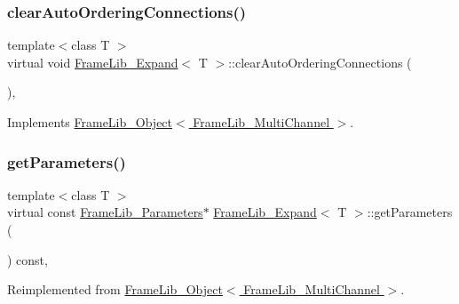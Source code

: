 \subsubsection{\texorpdfstring{clear\+Auto\+Ordering\+Connections()}{clearAutoOrderingConnections()}}
{\footnotesize\ttfamily template$<$class T $>$ \\
virtual void \hyperlink{class_frame_lib___expand}{Frame\+Lib\+\_\+\+Expand}$<$ T $>$\+::clear\+Auto\+Ordering\+Connections (\begin{DoxyParamCaption}{ }\end{DoxyParamCaption})\hspace{0.3cm}{\ttfamily [inline]}, {\ttfamily [virtual]}}



Implements \hyperlink{class_frame_lib___object_aac43ebfacb59081f7f60957380df7481}{Frame\+Lib\+\_\+\+Object$<$ Frame\+Lib\+\_\+\+Multi\+Channel $>$}.

\mbox{\label{class_frame_lib___expand_ae399eee75f1f0d854505eb67f8fb4dd0}} 
\subsubsection{\texorpdfstring{get\+Parameters()}{getParameters()}}
{\footnotesize\ttfamily template$<$class T $>$ \\
virtual const \hyperlink{class_frame_lib___parameters}{Frame\+Lib\+\_\+\+Parameters}$\ast$ \hyperlink{class_frame_lib___expand}{Frame\+Lib\+\_\+\+Expand}$<$ T $>$\+::get\+Parameters (\begin{DoxyParamCaption}{ }\end{DoxyParamCaption}) const\hspace{0.3cm}{\ttfamily [inline]}, {\ttfamily [virtual]}}



Reimplemented from \hyperlink{class_frame_lib___object_ac90a6770aeef26ee1601889dc16dba56}{Frame\+Lib\+\_\+\+Object$<$ Frame\+Lib\+\_\+\+Multi\+Channel $>$}.

\mbox{\label{class_frame_lib___expand_a77c0e4af675ebb2ac3f47b26939ab94b}} 
